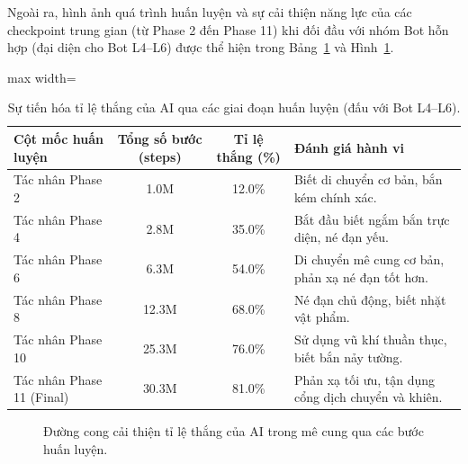 \documentclass[a4paper, 12pt]{report}
\begin{document}
  Ngoài ra, hình ảnh quá trình huấn luyện và sự cải thiện năng lực của các checkpoint trung gian (từ Phase 2 đến Phase 11) khi đối đầu với nhóm Bot hỗn hợp (đại diện cho Bot L4--L6) được thể hiện trong Bảng~\ref{tab:curriculum_winrate} và Hình~\ref{fig:learning_curve}.

  \begin{table}[H]
  \centering
  \caption{Sự tiến hóa tỉ lệ thắng của AI qua các giai đoạn huấn luyện (đấu với Bot L4--L6).}
  \label{tab:curriculum_winrate}
  \renewcommand{\arraystretch}{1.2}
  \small
  \begin{adjustbox}{max width=\textwidth}
  \begin{tabular}{l c c p{7cm}}
    \toprule
    \textbf{Cột mốc huấn luyện} & \textbf{Tổng số bước (steps)} & \textbf{Tỉ lệ thắng (\%)} & \textbf{Đánh giá hành vi} \\
    \midrule
    Tác nhân Phase 2 & 1.0M & 12.0\% & Biết di chuyển cơ bản, bắn kém chính xác. \\
    Tác nhân Phase 4 & 2.8M & 35.0\% & Bắt đầu biết ngắm bắn trực diện, né đạn yếu. \\
    Tác nhân Phase 6 & 6.3M & 54.0\% & Di chuyển mê cung cơ bản, phản xạ né đạn tốt hơn. \\
    Tác nhân Phase 8 & 12.3M & 68.0\% & Né đạn chủ động, biết nhặt vật phẩm. \\
    Tác nhân Phase 10 & 25.3M & 76.0\% & Sử dụng vũ khí thuần thục, biết bắn nảy tường. \\
    Tác nhân Phase 11 (Final) & 30.3M & 81.0\% & Phản xạ tối ưu, tận dụng cổng dịch chuyển và khiên. \\
    \bottomrule
  \end{tabular}
  \end{adjustbox}
  \end{table}

  \begin{figure}[H]
  \centering
  \caption{Đường cong cải thiện tỉ lệ thắng của AI trong mê cung qua các bước huấn luyện.}
  \label{fig:learning_curve}
  \end{figure}
\end{document}
